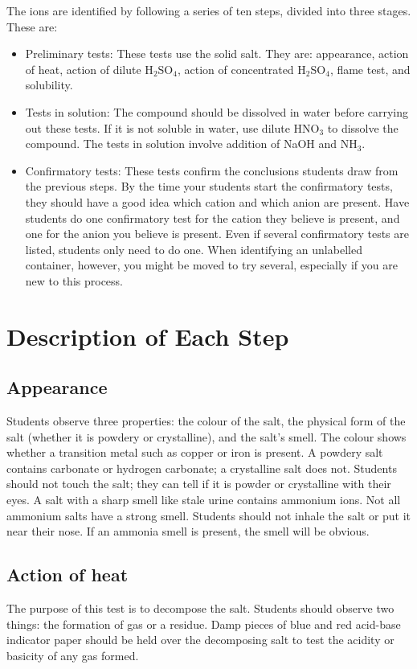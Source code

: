 The ions are identified by following a series of ten steps, 
divided into three stages. 
These are:
\begin{itemize}
\item{Preliminary tests:
These tests use the solid salt. 
They are: appearance, 
action of heat, 
action of dilute H$_{2}$SO$_{4}$, 
action of concentrated H$_{2}$SO$_{4}$, 
flame test, 
and solubility.}
\item{Tests in solution:
The compound should be dissolved in water before carrying out these tests. 
If it is not soluble in water, 
use dilute HNO$_{3}$ to dissolve the compound. 
The tests in solution involve addition of NaOH and NH$_{3}$.}
\item{Confirmatory tests:
These tests confirm the conclusions students draw from the previous steps. 
By the time your students start the confirmatory tests, 
they should have a good idea which cation and which anion are present. 
Have students do one confirmatory test for the cation they believe is present, 
and one for the anion you believe is present. 
Even if several confirmatory tests are listed, 
students only need to do one. 
When identifying an unlabelled container, 
however, 
you might be moved to try several, 
especially if you are new to this process.}
\end{itemize}

\section{Description of Each Step}
\subsection{Appearance}
Students observe three properties: the colour of the salt, 
the physical form of the salt (whether it is powdery or crystalline), 
and the salt's smell. 
The colour shows whether a transition metal such as copper 
or iron is present. 
A powdery salt contains carbonate or hydrogen carbonate; 
a crystalline salt does not. 
Students should not touch the salt; 
they can tell if it is powder or crystalline with their eyes. 
A salt with a sharp smell like stale urine contains ammonium ions. 
Not all ammonium salts have a strong smell. 
Students should not inhale the salt or put it near their nose. 
If an ammonia smell is present, 
the smell will be obvious.

\subsection{Action of heat}
The purpose of this test is to decompose the salt. 
Students should observe two things: the formation of gas or a residue. 
Damp pieces of blue and red acid-base indicator paper should be held 
over the decomposing salt to test the acidity or basicity of any gas formed.

